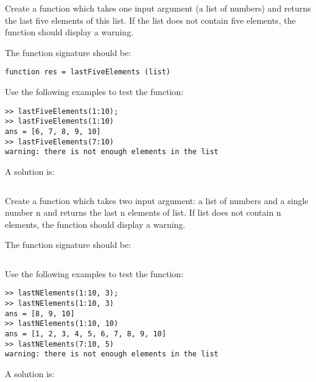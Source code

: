 \begin{ex}
Create a function which takes one input argument (a list of numbers)
and returns the last five elements of this list. If the list does not contain five
elements, the function should display a warning.

The function signature should be:
\begin{lstlisting}
function res = lastFiveElements (list)
\end{lstlisting}
Use the following examples to test the function:
\begin{lstlisting}
>> lastFiveElements(1:10);
>> lastFiveElements(1:10)
ans = [6, 7, 8, 9, 10]
>> lastFiveElements(7:10)
warning: there is not enough elements in the list
\end{lstlisting}
\begin{hint}
\end{hint}
\begin{sol}
A solution is:
\begin{lstlisting}
\end{lstlisting}
\end{sol}
\end{ex}


\begin{ex}
Create a function which takes two input argument: a list of numbers
and a single number n and returns the last n elements of list. If list does not
contain n elements, the function should display a warning.

The function signature should be:
\begin{lstlisting}
\end{lstlisting}
Use the following examples to test the function:
\begin{lstlisting}
>> lastNElements(1:10, 3);
>> lastNElements(1:10, 3)
ans = [8, 9, 10]
>> lastNElements(1:10, 10)
ans = [1, 2, 3, 4, 5, 6, 7, 8, 9, 10]
>> lastNElements(7:10, 5)
warning: there is not enough elements in the list
\end{lstlisting}
\begin{hint}
\end{hint}
\begin{sol}
A solution is:
\begin{lstlisting}
\end{lstlisting}
\end{sol}
\end{ex}
 